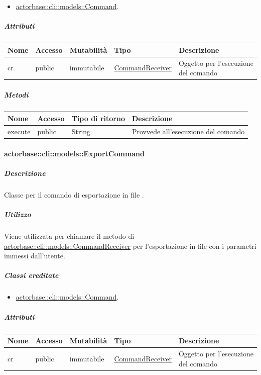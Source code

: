 \documentclass{scalatekids-article}
\begin{document}
\begin{itemize}
\item \hyperref[sec:actorbase::cli::models::Command]{actorbase::cli::models::Command}.
\end{itemize}

\subparagraph{Attributi}

\begin{tabular}{| p{1cm} | p{1.5cm} | p{2cm} | p{4cm} | p{8.5cm} |}
  \hline
  Nome & Accesso & Mutabilità & Tipo & Descrizione\\
  \hline
  cr & public & immutabile & \hyperref[sec:actorbase::cli::models::CommandReceiver]{CommandReceiver} & Oggetto per l'esecuzione del comando\\
  \hline
\end{tabular}

\subparagraph{Metodi}

\begin{tabular}{| l | l | l | l |}
  \hline
  Nome & Accesso & Tipo di ritorno & Descrizione\\
  \hline
  execute & public & String & Provvede all'esecuzione del comando\\
  \hline
\end{tabular}

\paragraph{actorbase::cli::models::ExportCommand}
\label{sec:actorbase::cli::models::ExportCommand}

\subparagraph{Descrizione}

Classe per il comando di esportazione in file .

\subparagraph{Utilizzo}

Viene utilizzata per chiamare il metodo di
\hyperref[sec:actorbase::cli::models::CommandReceiver]{actorbase::cli::models::CommandReceiver} per l'esportazione in file
 con i parametri immessi dall'utente.

\subparagraph{Classi ereditate}

\begin{itemize}
\item \hyperref[sec:actorbase::cli::models::Command]{actorbase::cli::models::Command}.
\end{itemize}

\subparagraph{Attributi}

\begin{tabular}{| p{1cm} | p{1.5cm} | p{2cm} | p{4cm} | p{8.5cm} |}
  \hline
  Nome & Accesso & Mutabilità & Tipo & Descrizione\\
  \hline
  cr & public & immutabile & \hyperref[sec:actorbase::cli::models::CommandReceiver]{CommandReceiver} & Oggetto per l'esecuzione del comando\\
  \hline
\end{tabular}
\end{document}
